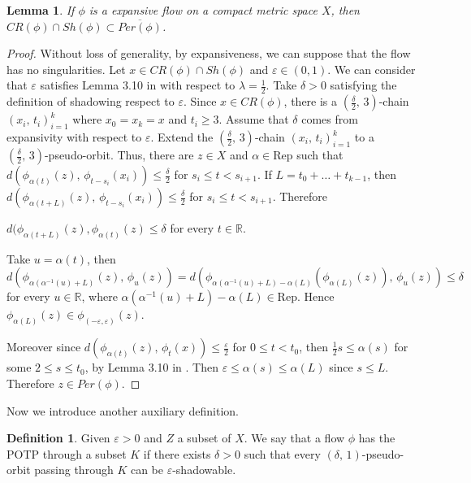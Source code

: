 \documentclass{amsart}
\newtheorem{lemma}[theorem]{Lemma}
\theoremstyle{definition}
\newtheorem{definition}[theorem]{Definition}
\newcommand{\ep}{\varepsilon}
\begin{document}
\begin{lemma}\label{3.55}
If $\phi$ is a expansive flow on a compact metric space $X$, then $CR(\phi)\cap Sh(\phi)\subset \overline{Per(\phi)}$.
\end{lemma}
\begin{proof}
Without loss of generality, by expansiveness, we can suppose that the flow has no singularities. Let $x\in CR(\phi)\cap Sh(\phi)$ and $\varepsilon\in (0,1)$. We can consider that $\varepsilon$ satisfies Lemma 3.10 in \cite{Hel} with respect to $\lambda=\frac{1}{2}$. Take $\delta>0$ satisfying the definition of shadowing respect to $\varepsilon$. Since $x\in CR(\phi)$, there is a $(\frac{\delta}{2},\, 3)$-chain $(x_i,\,t_i)_{i=1}^{k}$ where $x_0=x_k=x$ and $t_i\geq 3$. Assume that $\delta$ comes from expansivity with respect to $\varepsilon$. Extend the $(\frac{\delta}{2},\, 3)$-chain $(x_i,\,t_i)_{i=1}^{k}$ to a $(\frac{\delta}{2},\, 3)$-pseudo-orbit. Thus, there are $z\in X$ and $\alpha\in\mathrm{Rep}$ such that $d(\phi_{\alpha(t)}(z),\,\phi_{t-s_i}(x_i))\leq \frac{\delta}{2}$ for $s_i\leq t<s_{i+1}$. If $L=t_0+\ldots+t_{k-1}$, then $d(\phi_{\alpha(t+L)}(z),\,\phi_{t-s_i}(x_i))\leq \frac{\delta}{2}$ for $s_i\leq t<s_{i+1}$. Therefore
\begin{center}
$d(\phi_{\alpha(t+L)}(z),\phi_{\alpha(t)}(z)\leq \delta$ for every $t\in \mathbb{R}$. 
\end{center}
Take $u=\alpha(t)$, then
$$d(\phi_{\alpha(\alpha^{-1}(u)+L)}(z),\,\phi_{u}(z))=d(\phi_{\alpha(\alpha^{-1}(u)+L)-\alpha(L)}(\phi_{\alpha(L)}(z)),\,\phi_{u}(z))\leq \delta$$ for every $u\in \mathbb{R}$, where $\alpha(\alpha^{-1}(u)+L)-\alpha(L)\in \mathrm{Rep}$. Hence $\phi_{\alpha(L)}(z)\in \phi_{(-\varepsilon,\varepsilon)}(z)$. 

Moreover since $d(\phi_{\alpha(t)}(z),\,\phi_{t}(x))\leq \frac{\varepsilon}{2}$ for $0\leq t<t_0$, then $\frac{1}{2}s\leq \alpha(s)$  for some $2\leq s\leq t_0$, by Lemma 3.10 in \cite{Hel}. Then $\varepsilon\leq \alpha(s)\leq\alpha(L)$ since $s\leq L$. Therefore $z\in Per(\phi)$. 
\end{proof}

Now we introduce another auxiliary definition.

\begin{definition}\label{3.6}
Given $\ep>0$ and $Z$ a subset of $X$. We say that a flow $\phi$ has the POTP through a subset $K$ if there exists $\delta > 0$ such that every  $(\delta,\, 1)$-pseudo-orbit passing through $K$ can be $\ep$-shadowable.
\end{definition}
\end{document}
